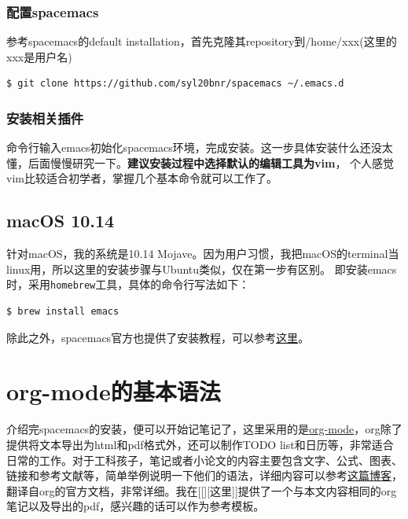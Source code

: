 \documentclass[11pt]{article}
\begin{document}
\subsubsection{配置spacemacs}
\label{sec:org8e86e98}
参考spacemacs的default installation，首先克隆其repository到/home/xxx(这里的xxx是用户名)
\begin{center}
\begin{verbatim}
$ git clone https://github.com/syl20bnr/spacemacs ~/.emacs.d
\end{verbatim}
\end{center}

\subsubsection{安装相关插件}
\label{sec:org858ee3b}
命令行输入emacs初始化spacemacs环境，完成安装。这一步具体安装什么还没太懂，后面慢慢研究一下。\textbf{建议安装过程中选择默认的编辑工具为vim}，
个人感觉vim比较适合初学者，掌握几个基本命令就可以工作了。

\subsection{macOS 10.14}
\label{sec:org752dbf0}
针对macOS，我的系统是10.14 Mojave。因为用户习惯，我把macOS的terminal当linux用，所以这里的安装步骤与Ubuntu类似，仅在第一步有区别。
即安装emacs时，采用\texttt{homebrew}工具，具体的命令行写法如下：
\begin{center}
\begin{verbatim}
$ brew install emacs
\end{verbatim}
\end{center}
除此之外，spacemacs官方也提供了安装教程，可以参考\href{https://github.com/syl20bnr/spacemacs\#macos}{这里}。

\section{org-mode的基本语法}
\label{sec:orgc5e2b4b}
介绍完spacemacs的安装，便可以开始记笔记了，这里采用的是\href{https://orgmode.org/}{org-mode}，org除了提供将文本导出为html和pdf格式外，还可以制作TODO list和日历等，非常适合日常的工作。对于工科孩子，笔记或者小论文的内容主要包含文字、公式、图表、链接和参考文献等，简单举例说明一下他们的语法，详细内容可以参考\href{https://www.cnblogs.com/Open\_Source/archive/2011/07/17/2108747.html}{这篇博客}，翻译自org的官方文档，非常详细。我在[[][这里]]提供了一个与本文内容相同的org笔记以及导出的pdf，感兴趣的话可以作为参考模板。
\end{document}

